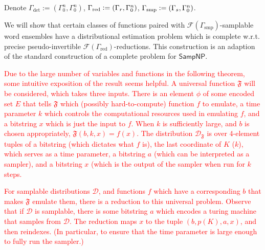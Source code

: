 \documentclass[11pt]{article}
\numberwithin{equation}{section}
\theoremstyle{definition}
\theoremstyle{plain}
\newcommand{\Dist}{\mathcal{D}}
\newcommand{\Fall}{\mathcal{F}}
\begin{document}
Denote ${\Gamma_\text{det}:=(\Gamma_0^n,\Gamma_0^n)}$, ${\Gamma_{\textnormal{red}}:=(\Gamma_{r},\Gamma_0^n)}$, ${\Gamma_{\textnormal{smp}}:=(\Gamma_{s},\Gamma_0^n)}$.

We will show that certain classes of functions paired with ${\Fall(\Gamma_{\text{smp}})}$-samplable word ensembles have a distributional estimation problem which is complete w.r.t. precise pseudo-invertible ${\Fall(\Gamma_{\text{red}})}$-reductions. This construction is an adaption of the standard construction of a complete problem for ${\mathsf{SampNP}}$.

\textcolor{red}{Due to the large number of variables and functions in the following theorem, some intuitive exposition of the result seems helpful. A universal function $\mathfrak{F}$ will be considered, which takes three inputs. There is an element $\phi$ of some encoded set $E$ that tells $\mathfrak{F}$ which (possibly hard-to-compute) function $f$ to emulate, a time parameter $k$ which controls the computational resources used in emulating $f$, and a bitstring $x$ which is just the input to $f$. When $k$ is sufficiently large, and $b$ is chosen appropriately, $\mathfrak{F}(b,k,x)=f(x)$. The distribution $\Dist_{\mathfrak{F}}$ is over 4-element tuples of a bitstring (which dictates what $f$ is), the last coordinate of $K$ ($k$), which serves as a time parameter, a bitstring $a$ (which can be interpreted as a sampler), and a bitstring $x$ (which is the output of the sampler when run for $k$ steps.}

\textcolor{red}{For samplable distributions $\Dist$, and functions $f$ which have a corresponding $b$ that makes $\mathfrak{F}$ emulate them, there is a reduction to this universal problem. Observe that if $\Dist$ is samplable, there is some bitstring $a$ which encodes a turing machine that samples from $\Dist$. The reduction maps $x$ to the tuple $(b,p(K),a,x)$, and then reindexes. (In particular, to ensure that the time parameter is large enough to fully run the sampler.)} %
\end{document}
